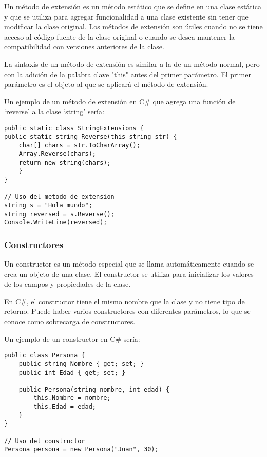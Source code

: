 \documentclass[executivepaper]{article}
\begin{document}
Un método de extensión es un método estático que se define en una clase estática y que se utiliza para agregar funcionalidad a una clase existente sin tener que modificar la clase original. Los métodos de extensión son útiles cuando no se tiene acceso al código fuente de la clase original o cuando se desea mantener la compatibilidad con versiones anteriores de la clase.

La sintaxis de un método de extensión es similar a la de un método normal, pero con la adición de la palabra clave "this" antes del primer parámetro. El primer parámetro es el objeto al que se aplicará el método de extensión.

Un ejemplo de un método de extensión en C\# que agrega una función de \enquote*{reverse} a la clase \enquote*{string} sería:
\begin{lstlisting}
public static class StringExtensions {
public static string Reverse(this string str) {
    char[] chars = str.ToCharArray();
    Array.Reverse(chars);
    return new string(chars);
    }
}

// Uso del metodo de extension
string s = "Hola mundo";
string reversed = s.Reverse();
Console.WriteLine(reversed);
\end{lstlisting}

\subsubsection*{Constructores}

Un constructor es un método especial que se llama automáticamente cuando se crea un objeto de una clase. El constructor se utiliza para inicializar los valores de los campos y propiedades de la clase.

En C\#, el constructor tiene el mismo nombre que la clase y no tiene tipo de retorno. Puede haber varios constructores con diferentes parámetros, lo que se conoce como sobrecarga de constructores.

Un ejemplo de un constructor en C\# sería:

\begin{lstlisting}
public class Persona {
    public string Nombre { get; set; }
    public int Edad { get; set; }

    public Persona(string nombre, int edad) {
        this.Nombre = nombre;
        this.Edad = edad;
    }
}

// Uso del constructor
Persona persona = new Persona("Juan", 30);
\end{lstlisting}
\end{document}
